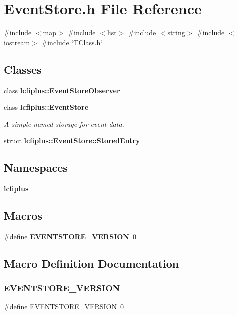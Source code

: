 \section{Event\+Store.\+h File Reference}
\label{EventStore_8h}
{\ttfamily \#include $<$map$>$}\newline
{\ttfamily \#include $<$list$>$}\newline
{\ttfamily \#include $<$string$>$}\newline
{\ttfamily \#include $<$iostream$>$}\newline
{\ttfamily \#include \char`\"{}T\+Class.\+h\char`\"{}}\newline
\subsection*{Classes}
\begin{DoxyCompactItemize}
\item 
class \textbf{ lcfiplus\+::\+Event\+Store\+Observer}
\item 
class \textbf{ lcfiplus\+::\+Event\+Store}
\begin{DoxyCompactList}\small\item\em A simple named storage for event data. \end{DoxyCompactList}\item 
struct \textbf{ lcfiplus\+::\+Event\+Store\+::\+Stored\+Entry}
\end{DoxyCompactItemize}
\subsection*{Namespaces}
\begin{DoxyCompactItemize}
\item 
 \textbf{ lcfiplus}
\end{DoxyCompactItemize}
\subsection*{Macros}
\begin{DoxyCompactItemize}
\item 
\#define \textbf{ E\+V\+E\+N\+T\+S\+T\+O\+R\+E\+\_\+\+V\+E\+R\+S\+I\+ON}~0
\end{DoxyCompactItemize}


\subsection{Macro Definition Documentation}
\mbox{\label{EventStore_8h_a9eb91b549ef5dd30a463406ebc32f21e}} 
\subsubsection{E\+V\+E\+N\+T\+S\+T\+O\+R\+E\+\_\+\+V\+E\+R\+S\+I\+ON}
{\footnotesize\ttfamily \#define E\+V\+E\+N\+T\+S\+T\+O\+R\+E\+\_\+\+V\+E\+R\+S\+I\+ON~0}

